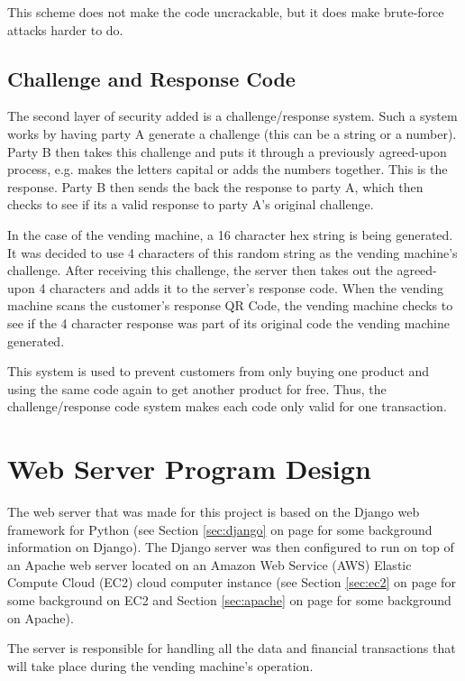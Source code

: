 This scheme does not make the code uncrackable, but it does make brute-force attacks harder to do. 

\subsection{Challenge and Response Code}

The second layer of security added is a challenge/response system. Such a system
works by having party A generate a challenge (this can be a string or a number).
Party B then takes this challenge and puts it through a previously agreed-upon
process, e.g. makes the letters capital or adds the numbers together. This
is the response. Party B then sends the back the response to party A, which then
checks to see if its a valid response to party A's original challenge.

In the case of the vending machine, a 16 character hex string is being
generated. It was decided to use 4 characters of this random string as the
vending machine's challenge. After receiving this challenge, the server then
takes out the agreed-upon 4 characters and adds it to the server's response
code. When the vending machine scans the customer's response QR Code, the
vending machine checks to see if the 4 character response was part of its
original code the vending machine generated.

This system is used to prevent customers from only buying one product and using
the same code again to get another product for free. Thus, the
challenge/response code system makes each code only valid for one transaction.

\section{Web Server Program Design}

The web server that was made for this project is based on the Django web framework for Python
(see Section \ref{sec:django} on page \pageref{sec:django} for some background information
on Django).
The Django server was then configured to run on top of an Apache web server located on an Amazon Web Service (AWS) Elastic
Compute Cloud (EC2) cloud computer instance (see Section \ref{sec:ec2} on page
\pageref{sec:ec2} for some background on EC2 and Section \ref{sec:apache} on page
\pageref{sec:apache} for some background on Apache).

The server is responsible for handling all the data and financial transactions that will take
place during the vending machine's operation. 

